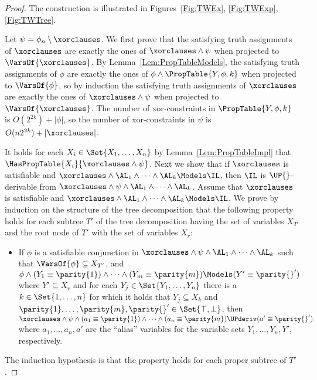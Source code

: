 \begin{proof}
The construction is illustrated in Figures~\ref{Fig:TWEx}, \ref{Fig:TWExp}, \ref{Fig:TWTree}.

Let $ \psi = \phi_n \setminus \xorclauses $.
We first prove that the satisfying truth assignments of $\xorclauses$ are
exactly the ones of $\xorclauses \wedge \psi$ when projected to
$\VarsOf{\xorclauses}$. 
By Lemma~\ref{Lem:PropTableModels}, the satisfying truth assignments of $ \phi$ are exactly the ones of $ \phi \wedge \PropTable{Y, \phi, k} $ when projected
to $\VarsOf{\phi}$, so by induction the satisfying truth assignments of $
\xorclauses$ are exactly the ones of $ \xorclauses \wedge \psi$ when projected
to $ \VarsOf{\xorclauses}$.
The number of xor-constraints in $ \PropTable{Y, \phi, k} $ is $O(2^{2k}) +
|\phi|$, so the number of xor-constraints in $ \psi $ is $ O(n 2^{2k}) +
|\xorclauses| $.

It holds for each $ X_i \in \Set{X_1, \dots, X_n} $ by
Lemma~\ref{Lem:PropTableImpl} that $ \HasPropTable{X_i}{\xorclauses \wedge
\psi}$.
Next we show that if $\xorclauses$ is satisfiable and $\xorclauses \wedge \AL_1
\wedge \dots \wedge \AL_k \Models \IL$, then $\IL$ is $\UP{}$-derivable from $
\xorclauses \wedge \psi \wedge \AL_1 \wedge \dots \wedge
\AL_k$. 
Assume that $ \xorclauses$ is satisfiable and $ \xorclauses \wedge \AL_1 \wedge \dots \wedge \AL_k \Models \IL $.
\newcommand{\subtree}{\ensuremath{T'}}
We prove by induction on the structure of the tree decomposition that the
following property holds for each subtree $\subtree$ of the tree decomposition having the set of variables $X_{T'}$ and the root node of
$\subtree$ with the set of variables $X_r$:
\begin{itemize}
\item If $\phi$ is a satisfiable conjunction in $\xorclauses \wedge \psi \wedge \AL_1 \wedge \dots \wedge \AL_k $ such that
$\VarsOf{\phi} \subseteq X_{T'}$,
and $ \phi \wedge (Y_1 \equiv \parity{1}) \wedge
\dots \wedge (Y_m \equiv \parity{m}) \Models (Y' \equiv \parity{}') $ 
where $Y' \subseteq X_r $ and for each $Y_j \in \Set{Y_1,\dots,Y_n}$ there is a
$k \in \Set{1,\dots,n}$ for which it holds that $Y_j \subseteq X_k $
and
$\parity{1},\dots,\parity{m},\parity{}' \in \Set{\top,\bot}$, 
then $\xorclauses \wedge \psi \wedge (a_1 \equiv \parity{1}) \wedge \dots \wedge (a_n \equiv
        \parity{m}) \UPderiv (a' \equiv \parity{}')$
where $a_1,\dots,a_n,a'$ are the ``alias'' variables for the variable sets
$Y_1,\dots,Y_n,Y'$, respectively.
\end{itemize}
The induction hypothesis is that the property holds for each proper subtree of
$T'$.


\end{proof}
